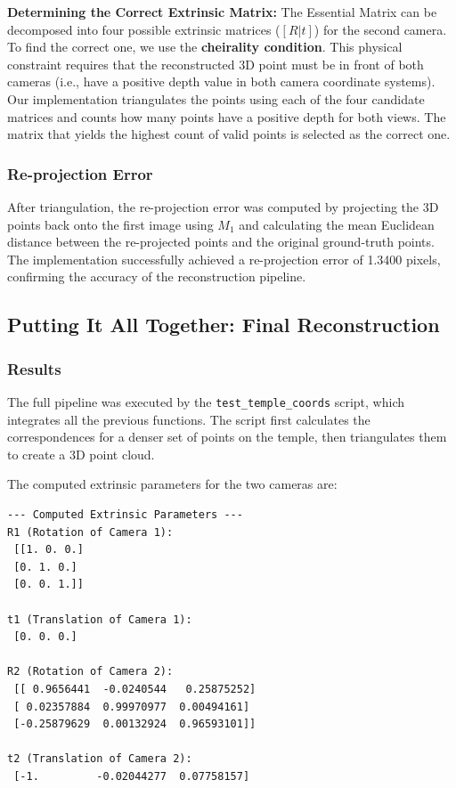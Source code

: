 \documentclass{article}
\begin{document}
\textbf{Determining the Correct Extrinsic Matrix:} The Essential Matrix can be decomposed into four possible extrinsic matrices ($[R|t]$) for the second camera. To find the correct one, we use the \textbf{cheirality condition}. This physical constraint requires that the reconstructed 3D point must be in front of both cameras (i.e., have a positive depth value in both camera coordinate systems). Our implementation triangulates the points using each of the four candidate matrices and counts how many points have a positive depth for both views. The matrix that yields the highest count of valid points is selected as the correct one.

\subsubsection{Re-projection Error}
After triangulation, the re-projection error was computed by projecting the 3D points back onto the first image using $M_1$ and calculating the mean Euclidean distance between the re-projected points and the original ground-truth points. The implementation successfully achieved a re-projection error of 1.3400 pixels, confirming the accuracy of the reconstruction pipeline.

\subsection{Putting It All Together: Final Reconstruction}
\subsubsection{Results}
The full pipeline was executed by the \texttt{test\_temple\_coords} script, which integrates all the previous functions. The script first calculates the correspondences for a denser set of points on the temple, then triangulates them to create a 3D point cloud.

The computed extrinsic parameters for the two cameras are:
\begin{verbatim}
--- Computed Extrinsic Parameters ---
R1 (Rotation of Camera 1):
 [[1. 0. 0.]
 [0. 1. 0.]
 [0. 0. 1.]]

t1 (Translation of Camera 1):
 [0. 0. 0.]

R2 (Rotation of Camera 2):
 [[ 0.9656441  -0.0240544   0.25875252]
 [ 0.02357884  0.99970977  0.00494161]
 [-0.25879629  0.00132924  0.96593101]]

t2 (Translation of Camera 2):
 [-1.         -0.02044277  0.07758157]
\end{verbatim}
\end{document}
